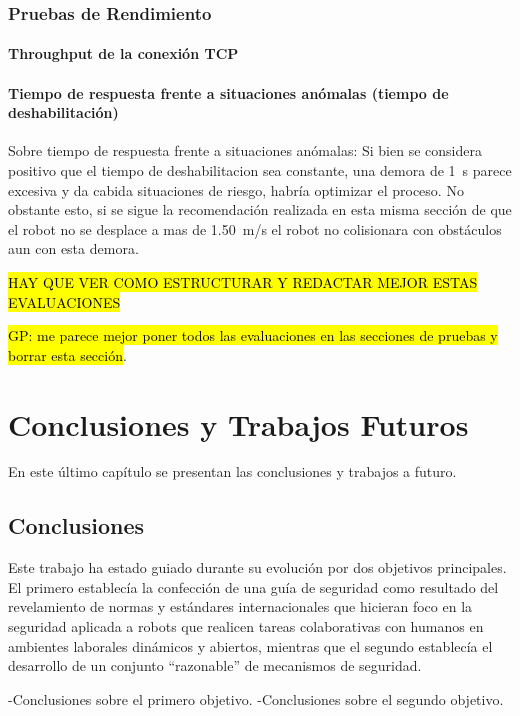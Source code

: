 \documentclass[withindex,glossary]{cam-thesis}
\begin{document}
\subsection{Pruebas de Rendimiento}
\subsubsection{Throughput de la conexión TCP}

\subsubsection{Tiempo de respuesta frente a situaciones anómalas (tiempo de deshabilitación)}
Sobre tiempo de respuesta frente a situaciones anómalas: Si bien se considera positivo que el tiempo de deshabilitacion sea constante, una demora de \SI{1}{\second} parece excesiva y da cabida situaciones de riesgo, habría optimizar el proceso. No obstante esto, si se sigue la recomendación realizada en esta misma sección de que el robot no se desplace a mas de \SI{1.50}{\metre/\second} el robot no colisionara con obstáculos aun con esta demora.

\hl{HAY QUE VER COMO ESTRUCTURAR Y REDACTAR MEJOR ESTAS EVALUACIONES}

\hl{GP: me parece mejor poner todos las evaluaciones en las secciones de pruebas y borrar esta secci\'{o}n}.

\chapter{Conclusiones y Trabajos Futuros}

En este último capítulo se presentan las conclusiones y trabajos a futuro.

\section{Conclusiones}
Este trabajo ha estado guiado durante su evolución por dos objetivos principales. El primero establecía la confección de una guía de seguridad como resultado del revelamiento de normas y estándares internacionales que hicieran foco en la seguridad aplicada a robots que realicen tareas colaborativas con humanos en ambientes laborales dinámicos y abiertos, mientras que el segundo establecía el desarrollo de un conjunto ``razonable'' de mecanismos de seguridad.

-Conclusiones sobre el primero objetivo.
-Conclusiones sobre el segundo objetivo.
\end{document}
